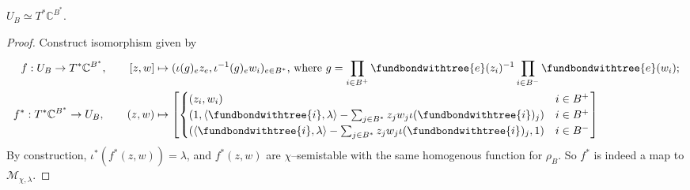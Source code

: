 \documentclass[b5paper]{article}
\newcommand{\MM}{\mathcal{M}}
\begin{document}
\begin{proposition}[pps:]{}
  $U_B\simeq T^*\mathbb{C}^{B^*}$.
  \begin{proof}
      Construct isomorphism given by
      \begin{alignat*}{1}
          f:U_B\rightarrow T^*\mathbb{C}^{B^*}, \qquad [z,w]&\mapsto (\iota(g)_ez_e,\iota^{-1}(g)_ew_i)_{e\in B^*}\textnormal{, where }g=\prod_{i\in B^+}^{}\fundbondwithtree{e}(z_i)^{-1}\prod_{i\in B^-}^{}\fundbondwithtree{e}(w_i);\\
          f^*:T^*\mathbb{C}^{B^*}\rightarrow U_B, \qquad (z,w)&\mapsto 
          \left[
              \begin{cases}
                  (z_i,w_i)&i\in B^+\\
                  (1, \AB{\fundbondwithtree{i},\lambda}-\sum_{j\in B^*}^{}z_jw_j\iota(\fundbondwithtree{i})_j) &i\in B^+\\
                  (\AB{\fundbondwithtree{i},\lambda}-\sum_{j\in B^*}^{}z_jw_j\iota(\fundbondwithtree{i})_j,1) &i\in B^-\\
              \end{cases}
          \right]
      \end{alignat*}
      By construction, $\iota^*(f^*(z,w))=\lambda$, and $f^*(z,w)$ are $\chi$--semistable with the same homogenous function for $\rho_{B}$. So $f^*$ is indeed a map to $\MM_{\chi,\lambda}$.
  \end{proof}
\end{proposition}
\end{document}
